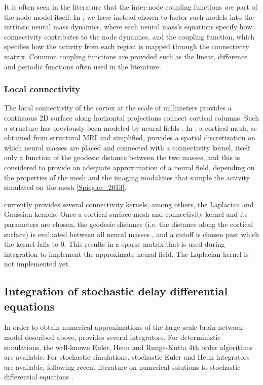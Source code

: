 	It is often seen in the literature that the inter-node coupling functions
	\textit{are} part of the node model itself. In \TVB, we have instead 
	chosen to factor such models into the intrinsic neural mass dynamics, where each 
	neural mass's equations specify how connectivity contributes to the
	node dynamics, and the coupling function, which specifies how the activity
	from each region is mapped through the connectivity matrix. Common coupling 
	functions are provided such as the linear, difference and periodic functions
	often used in the literature.

	\subsubsection{Local connectivity}

	The local connectivity of the cortex at the scale of millimeters provides
	a continuous 2D surface along horizontal projections connect 
	cortical columns. Such a structure has previously been modeled by
	neural fields \cite{Amari_1977,Jirsa_1997}. In \TVB, a cortical mesh, 
	as obtained from structural MRI and simplified, provides a spatial 
	discretization on which neural masses are placed and connected with a
	connectivity kernel, itself only a function of the geodesic distance
	between the two masses, and this is considered to provide an
	adequate approximation of a neural field, depending on the properties
	of the mesh and the imaging modalities that sample the activity simulated
	on the mesh \ref{Spiegler_2013}.

	\TVB currently provides several connectivity kernels, among others, 
	the Laplacian and Gaussian kernels. Once a cortical surface mesh 
	and connectivity kernel and its parameters are chosen, the geodesic
	distance (i.e. the distance along the cortical surface) is evaluated
	between all neural masses \cite{Mitchell1987}, and a cutoff is chosen
	past which the kernel falls to 0. This results in a sparse matrix that 
	is used during integration to implement the approximate neural field. 
	\note[psl] The Laplacian kernel is not implemented yet.

\subsection{Integration of stochastic delay differential equations}

	In order to obtain numerical approximations of the large-scale brain network model 
	described above, \TVB provides several integrators. For
	deterministic simulations, the well-known Euler, 
	Heun and Runge-Kutta 4th order algorithms are available. For stochastic
	simulations, stochastic Euler and Heun integrators are available, 
	following recent literature on numerical solutions to stochastic
	differential equations \cite{Kloeden_1995,Mannella_2002,Mannella_1989}.

